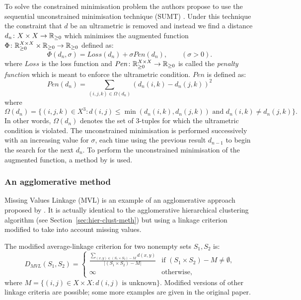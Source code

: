 To solve the constrained minimisation problem the authors propose to use the
sequential unconstrained minimisation technique (SUMT)
\cite{fiacco1964sequential}.  Under this technique the constraint that $d$ be
an ultrametric is removed and instead we find a distance $d_n \colon X \times
X \to {\mathbb R}_{\geq 0}$ which minimises the augmented function $\Phi \colon {\mathbb R}_{\geq 0}^{X
  \times X} \times {\mathbb R}_{\geq 0} \to {\mathbb R}_{\geq 0}$ defined as:
\begin{equation*}
  \label{eq:partial-dist-optimisation}
  \Phi(d_n,\sigma) = Loss(d_n) + \sigma Pen(d_n), \qquad (\sigma > 0).
\end{equation*}
where $Loss$ is the loss function and $Pen \colon {\mathbb R}_{\geq 0}^{X \times X} \to
{\mathbb R}_{\geq 0}$ is called the \textit{penalty function} which is meant to enforce the
ultrametric condition.  $Pen$ is defined as:
\begin{equation*}
  \label{eq:penalty-function}
  Pen(d_n) = \sum_{(i,j,k) \in \Omega(d_n)} (d_n(i,k) - d_n(j,k))^2
\end{equation*}
where
\begin{equation*}
  \Omega(d_n) = \{(i,j,k) \in X^3 \colon d(i,j) \leq \min(d_n(i,k),d_n(j,k))
  \text{ and } d_n(i,k) \neq d_n(j,k)\}.
\end{equation*}
In other words, $\Omega(d_n)$ denotes the set of $3$-tuples for which the
ultrametric condition is violated.  The unconstrained minimisation is
performed successively with an increasing value for $\sigma$, each time using
the previous result $d_{n-1}$ to begin the search for the next $d_n$.  To
perform the unconstrained minimisation of the augmented function, a method by
\cite{powell1977restart} is used.

\subsubsection{An agglomerative method}
\label{sec:part-dist-agglom-method}

Missing Values Linkage (MVL) is an example of an agglomerative approach
proposed by \cite{schader1992mvl}.  It is actually identical to the
agglomerative hierarchical clustering algorithm (see
Section~\ref{sec:hier-clust-meth}) but using a linkage criterion modified to
take into account missing values.

The modified
average-linkage criterion for two nonempty sets $S_1, S_2$ is:
\begin{equation*}
  D_{MVL}(S_1,S_2) =
  \begin{cases}
    \displaystyle
    \frac{\displaystyle \sum_{(x,y) \in (S_1 \times S_2) - M} d(x,y)}
         {|(S_1 \times S_2) - M|} & \text{if $(S_1
      \times S_2) - M \neq \emptyset$,} \\
    \infty & \text{otherwise},
  \end{cases}
\end{equation*}
where $M = \{(i,j) \in X \times X \colon d(i,j) \text{ is unknown}\}$.
Modified versions of other linkage criteria are possible; some more examples
are given in the original paper.

